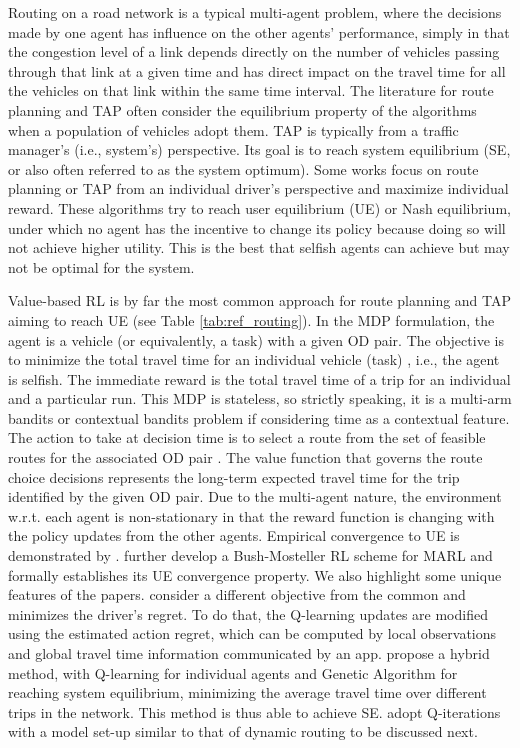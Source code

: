 \documentclass{article}
\begin{document}
Routing on a road network is a typical multi-agent problem, where the decisions made by one agent has influence on the other agents' performance, simply in that the congestion level of a link depends directly on the number of vehicles passing through that link at a given time and has direct impact on the travel time for all the vehicles on that link within the same time interval.  
The literature for route planning and TAP often consider the equilibrium property of the algorithms when a population of vehicles adopt them. TAP is typically from a traffic manager's (i.e., system's) perspective. Its goal is to reach system equilibrium (SE, or also often referred to as the system optimum). Some works focus on route planning or TAP from an individual driver's perspective and maximize individual reward. These algorithms try to reach user equilibrium (UE) or Nash equilibrium, under which no agent has the incentive to change its policy because doing so will not achieve higher utility. This is the best that selfish agents can achieve but may not be optimal for the system. 

Value-based RL is by far the most common approach for route planning and TAP aiming to reach UE (see Table \ref{tab:ref_routing}). In the MDP formulation, the agent is a vehicle (or equivalently, a task) with a given OD pair. The objective is to minimize the total travel time for an individual vehicle (task) \citep{mainali2008optimal,ramos2018analysing,zhou2020reinforcement}, i.e., the agent is selfish. The immediate reward is the total travel time of a trip for an individual and a particular run. This MDP is stateless, so strictly speaking, it is a multi-arm bandits or contextual bandits problem \citep{li2010contextual} if considering time as a contextual feature.   The action to take at decision time is to select a route from the set of feasible routes for the associated OD pair \citep{ramos2018analysing,zhou2020reinforcement,bazzan2015hybrid}. The value function that governs the route choice decisions represents the long-term expected travel time for the trip identified by the given OD pair. Due to the multi-agent nature, the environment w.r.t. each agent is non-stationary in that the reward function is changing with the policy updates from the other agents. Empirical convergence to UE is demonstrated by \cite{ramos2018analysing}. \cite{zhou2020reinforcement} further develop a Bush-Mosteller RL scheme for MARL and formally establishes its UE convergence property. 
We also highlight some unique features of the papers. \cite{ramos2018analysing} consider a different objective from the common and minimizes the driver's regret. To do that, the Q-learning updates are modified using the estimated action regret, which can be computed by local observations and global travel time information communicated by an app. \cite{bazzan2015hybrid} propose a hybrid method, with Q-learning for individual agents and
Genetic Algorithm for reaching system equilibrium, minimizing the average travel time over different trips in the network. This method is thus able to achieve SE. \cite{mainali2008optimal} adopt Q-iterations with a model set-up similar to that of dynamic routing to be discussed next.
\end{document}
